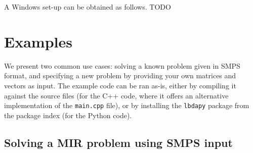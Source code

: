 \documentclass[12pt, english]{article}
\begin{document}
A Windows set-up can be obtained as follows. TODO

\section{Examples}
\label{sec:examples}

We present two common use cases: solving a known problem given in SMPS format, and specifying a new problem by providing your own matrices and vectors as input. The example code can be ran as-is, either by compiling it against the source files (for the C++ code, where it offers an alternative implementation of the \texttt{main.cpp} file), or by installing the \texttt{lbdapy} package from the package index (for the Python code).

\subsection{Solving a MIR problem using SMPS input}
\label{subsec:solving_smps_example}
\end{document}
